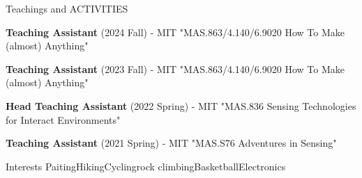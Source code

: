 \documentclass{resume} %
\begin{document}
\begin{rSection}{Teachings and ACTIVITIES}

\begin{itemlabel}
\item \textbf{Teaching Assistant} (2024 Fall) - MIT "MAS.863/4.140/6.9020 How To Make (almost) Anything"
\smallskip
\smallskip

\item \textbf{Teaching Assistant} (2023 Fall) - MIT "MAS.863/4.140/6.9020 How To Make (almost) Anything"
\smallskip
\smallskip

\item \textbf{Head Teaching Assistant} (2022 Spring) - MIT "MAS.836 Sensing Technologies for Interact Environments"
\smallskip
\smallskip

\item \textbf{Teaching Assistant} (2021 Spring) - MIT "MAS.S76 Adventures in Sensing"

\end{itemlabel}
\end{rSection}

\begin{rSection}{Interests}
Paiting\hspace{0.5cm}Hiking\hspace{0.5cm}Cycling\hspace{0.5cm}rock climbing\hspace{0.5cm}Basketball\hspace{0.5cm}Electronics
\end{rSection}

\end{document}
